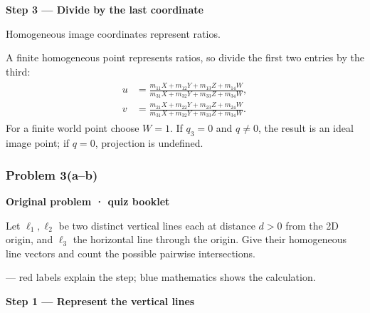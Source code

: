 \documentclass[letterpaper,11pt,english,openany,oneside]{jupyterBook}
\begin{document}
\par\medskip{}
{\color{QuizStepRed}\bfseries Step 3 — Divide by the last coordinate}\par\smallskip

\sphinxAtStartPar
{} Homogeneous image coordinates represent ratios.

\sphinxAtStartPar
A finite homogeneous point represents ratios, so divide the first two entries by the third:
{\color{QuizMathBlue} \begin{equation*}
\begin{split}
\begin{aligned}
u&=\frac{m_{11}X+m_{12}Y+m_{13}Z+m_{14}W}{m_{31}X+m_{32}Y+m_{33}Z+m_{34}W},\\
v&=\frac{m_{21}X+m_{22}Y+m_{23}Z+m_{24}W}{m_{31}X+m_{32}Y+m_{33}Z+m_{34}W}.
\end{aligned}
\end{split}
\end{equation*}}
\sphinxAtStartPar
For a finite world point choose {\color{QuizMathBlue} \(W=1\)}. If {\color{QuizMathBlue} \(q_3=0\)} and {\color{QuizMathBlue} \(q\ne0\)}, the result is an ideal image point; if {\color{QuizMathBlue} \(q=0\)}, projection is undefined.

\par


\subsubsection{Problem 3(a–b)}
\label{\detokenize{lectures/lecture02/quiz-workbook:problem-3-ab}}\label{\detokenize{lectures/lecture02/quiz-workbook:quiz-8-q3}}\label{\detokenize{lectures/lecture02/quiz-workbook:ex-lec02-intersections}}
\par\medskip\textbf{Original problem · quiz booklet}\par\smallskip

\sphinxAtStartPar
Let \(\ell_1,\ell_2\) be two distinct vertical lines each at distance \(d>0\) from the 2D origin, and \(\ell_3\) the horizontal line through the origin. Give their homogeneous line vectors and count the possible pairwise intersections.

\par\medskip

\sphinxAtStartPar
{} — red labels explain the step; blue mathematics shows the calculation.

\par\medskip{}
{\color{QuizStepRed}\bfseries Step 1 — Represent the vertical lines}\par\smallskip
\end{document}
